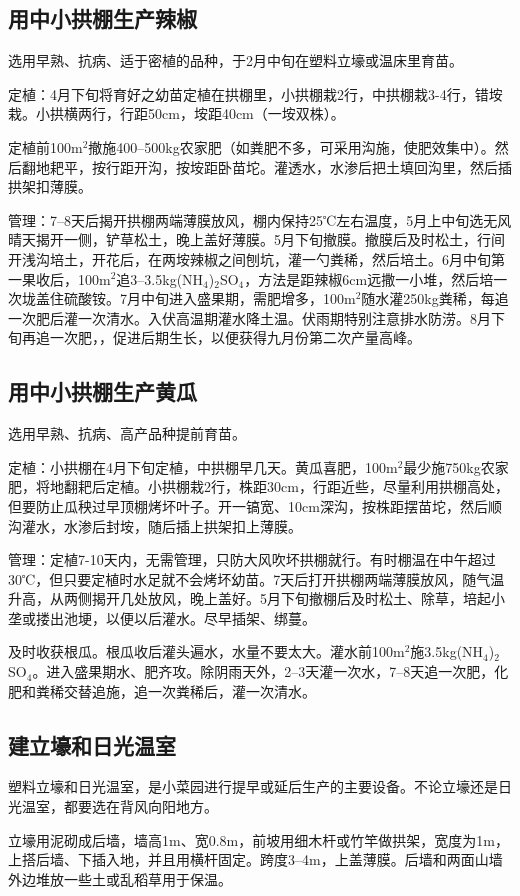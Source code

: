 \documentclass{ctexbook}
\begin{document}
\subsection{用中小拱棚生产辣椒}
选用早熟、抗病、适于密植的品种，于2月中旬在塑料立壕或温床里育苗。

定植：4月下旬将育好之幼苗定植在拱棚里，小拱棚栽2行，中拱棚栽3-4行，错垵栽。小拱横两行，行距50cm，垵距40cm（一垵双株）。

定植前100m$^2$撤施400--500kg农家肥（如粪肥不多，可采用沟施，使肥效集中）。然后翻地耙平，按行距开沟，按垵距卧苗坨。灌透水，水渗后把土填回沟里，然后插拱架扣薄膜。

管理：7--8天后揭开拱棚两端薄膜放风，棚内保持25℃左右温度，5月上中旬选无风晴天揭开一侧，铲草松土，晚上盖好薄膜。5月下旬撤膜。撤膜后及时松土，行间开浅沟培土，开花后，在两垵辣椒之间刨坑，灌一勺粪稀，然后培土。6月中旬第一果收后，100m$^2$追3--3.5kg(NH$_4$)$_2$SO$_4$，方法是距辣椒6cm远撒一小堆，然后培一次垅盖住硫酸铵。7月中旬进入盛果期，需肥增多，100m$^2$随水灌250kg粪稀，每追一次肥后灌一次清水。入伏高温期灌水降土温。伏雨期特别注意排水防涝。8月下旬再追一次肥，，促进后期生长，以便获得九月份第二次产量高峰。
\subsection{用中小拱棚生产黄瓜}
选用早熟、抗病、高产品种提前育苗。

定植：小拱棚在4月下旬定植，中拱棚早几天。黄瓜喜肥，100m$^2$最少施750kg农家肥，将地翻耙后定植。小拱棚栽2行，株距30cm，行距近些，尽量利用拱棚高处，但要防止瓜秧过早顶棚烤坏叶子。开一镐宽、10cm深沟，按株距摆苗坨，然后顺沟灌水，水渗后封垵，​随后插上拱架扣上薄膜。

管理：定植7-10天内，无需管理，只防大风吹坏拱棚就行。有时棚温在中午超过30℃，但只要定植时水足就不会烤坏幼苗。7天后打开拱棚两端薄膜放风，随气温升高，从两侧揭开几处放风，晚上盖好。5月下旬撤棚后及时松土、除草，培起小垄或搂出池埂，以便以后灌水。尽早插架、绑蔓。

及时收获根瓜。根瓜收后灌头遍水，水量不要太大。灌水前100m$^2$施3.5kg(NH$_4$)$_2$SO$_4$。进入盛果期水、肥齐攻。除阴雨天外，2--3天灌一次水，7--8天追一次肥，化肥和粪稀交替追施，追一次粪稀后，灌一次清水。
\subsection{建立壕和日光温室}
塑料立壕和日光温室，是小菜园进行提早或延后生产的主要设备。不论立壕还是日光温室，都要选在背风向阳地方。

立壕用泥砌成后墙，墙高1m、宽0.8m，前坡用细木杆或竹竿做拱架，宽度为1m，上搭后墙、下插入地，并且用横杆固定。跨度3--4m，上盖薄膜。后墙和两面山墙外边堆放一些土或乱稻草用于保温。
\end{document}
